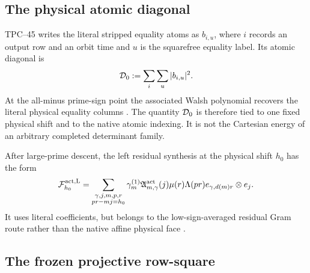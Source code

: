 \subsection{The physical atomic diagonal}

TPC--45 writes the literal stripped equality atoms as
\(b_{i,u}\), where \(i\) records an output row and an orbit time and
\(u\) is the squarefree equality label.  Its atomic diagonal is
\begin{equation}
 \mathcal D_0:=\sum_i\sum_u|b_{i,u}|^2.
 \label{eq:tpc49-physical-atomic-diagonal}
\end{equation}
At the all-minus prime-sign point the associated Walsh polynomial
recovers the literal physical equality columns \citep{WangTPC45}.  The
quantity \(\mathcal D_0\) is therefore tied to one fixed physical shift and to
the native atomic indexing.  It is not the Cartesian energy of an
arbitrary completed determinant family.

After large-prime descent, the left residual synthesis at the physical
shift \(h_0\) has the form
\begin{equation}
 \mathcal F_{h_0}^{\rm act,L}
 =\sum_{\substack{\gamma,j,m,p,r\\pr-mj=h_0}}
 \gamma_m^{(1)}
 \mathfrak A_{m,\gamma}^{\rm act}(j)
 \mu(r)\Lambda(pr)
 e_{\gamma,d(m)r}\otimes e_j.
 \label{eq:tpc49-physical-residual}
\end{equation}
It uses literal coefficients, but belongs to the low-sign-averaged
residual Gram route rather than the native affine physical face
\citep{WangTPC45,WangTPC47}.

\subsection{The frozen projective row-square}

